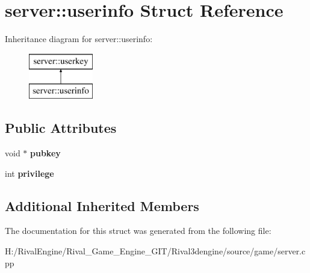 \hypertarget{structserver_1_1userinfo}{}\section{server\+:\+:userinfo Struct Reference}
\label{structserver_1_1userinfo}
Inheritance diagram for server\+:\+:userinfo\+:\begin{figure}[H]
\begin{center}
\leavevmode
\includegraphics[height=2.000000cm]{structserver_1_1userinfo}
\end{center}
\end{figure}
\subsection*{Public Attributes}
\begin{DoxyCompactItemize}
\item 
\mbox{\label{structserver_1_1userinfo_a242838108fac313b5b41806e00d0f548}} 
void $\ast$ {\bfseries pubkey}
\item 
\mbox{\label{structserver_1_1userinfo_a0891deb6bc5b68b952ef64ed624db84d}} 
int {\bfseries privilege}
\end{DoxyCompactItemize}
\subsection*{Additional Inherited Members}


The documentation for this struct was generated from the following file\+:\begin{DoxyCompactItemize}
\item 
H\+:/\+Rival\+Engine/\+Rival\+\_\+\+Game\+\_\+\+Engine\+\_\+\+G\+I\+T/\+Rival3dengine/source/game/server.\+cpp\end{DoxyCompactItemize}
